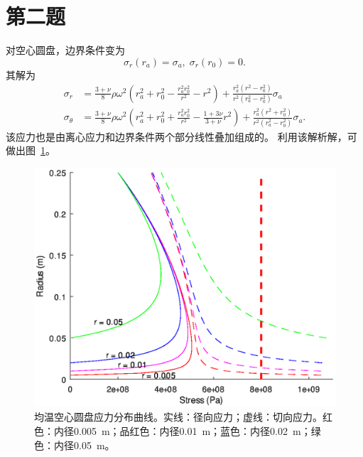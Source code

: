\section{第二题}

对空心圆盘，边界条件变为
\begin{equation}
    \sigma_r (r_a) = \sigma_a,\; \sigma_r(r_0) = 0.
\end{equation}
其解为
\begin{equation}
    \begin{aligned}
        \sigma_r &= \frac{3 + \nu}{8} \rho \omega^2 \left( r_a^2 + r_0^2 - \frac{r_a^2 r_0^2}{r^2} - r^2\right) + \frac{r_a^2(r^2 - r_0^2)}{r^2(r_a^2 - r_0^2)}\sigma_a \\
        \sigma_\theta &= \frac{3+\nu}{8} \rho \omega^2 \left( r_a^2 + r_0^2 + \frac{r_a^2 r_0^2}{r^2} - \frac{1+3\nu}{3+\nu} r^2\right) + \frac{r_a^2(r^2 + r_0^2)}{r^2(r_a^2 - r_0^2)}\sigma_a.
    \end{aligned}
\end{equation}
该应力也是由离心应力和边界条件两个部分线性叠加组成的。
利用该解析解，可做出图~\ref{fig:part-2-question-2}。

\begin{figure}[!tb]
    \centering
    \includegraphics[width=\linewidth]{part-2-question-2.eps}
    \caption{均温空心圆盘应力分布曲线。实线：径向应力；虚线：切向应力。红色：内径\qty{0.005}{m}；品红色：内径\qty{0.01}{m}；蓝色：内径\qty{0.02}{m}；绿色：内径\qty{0.05}{m}。}
    \label{fig:part-2-question-2}
\end{figure}

